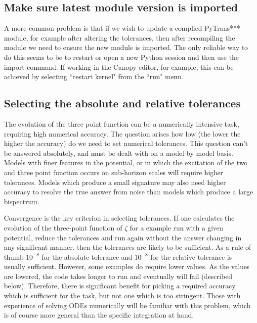 \documentclass[10pt,
amsmath,amssymb,
aps,prd,nofootinbib,eqsecnum,a4paper]{revtex4}
\begin{document}
\subsection{Make sure latest module version is imported}

A more common problem is that if we wish to update a complied PyTrans*** module, for 
example after altering the tolerances, then after recompiling the module we need to 
ensure the new module is imported. The only reliable way to do this seems to be to restart or open 
a new Python session
 and then use the import command. If working in the Canopy editor, for example, this can be achieved by selecting 
 ``restart kernel" from the ``run" menu. 

\subsection{Selecting the absolute and relative tolerances}

The evolution of the three point function  can be a numerically intensive task, requiring high numerical 
accuracy. The question arises how low (the lower the higher the accuracy) do we need to set numerical 
tolerances. This question can't be answered absolutely, and must be dealt with on a model by model basis. Models 
with finer features in the potential, or in which the excitation of the two and three point function 
occurs on sub-horizon scales will require higher tolerances. Models which produce a small signature may also need 
higher accuracy to resolve the true answer from noise than models which produce a large bispectrum. 

Convergence is the key criterion in selecting tolerances. If one calculates the evolution of the three-point 
function of $\zeta$ for a example run with a given potential, reduce the tolerances and run again without the answer 
changing in any significant manner, then the tolerances are likely to be sufficient.  As a rule of thumb 
$10^{-8}$ for the absolute tolerance and $10^{-8}$ for the relative tolerance is usually sufficient. 
However, some examples do require lower values. As the values 
are lowered,  the code takes longer to run and eventually will fail (described below). Therefore, 
there is significant benefit for picking a required accuracy which is sufficient for the task, but not one which is too 
stringent. Those with experience of solving ODEs numerically will be familiar with this problem, which is of course 
more general than the specific integration at hand.
\end{document}

